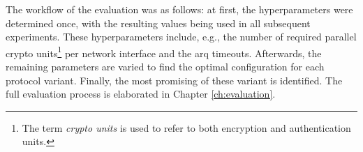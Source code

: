 The workflow of the evaluation was as follows: at first, the hyperparameters were determined once, with the resulting values being used in all
subsequent experiments. These hyperparameters include, e.g., the number of required parallel crypto units\footnote{The term \textit{crypto units} is
used to refer to both encryption and authentication units.} per network interface and the \gls{arq} timeouts. Afterwards, the remaining parameters are
varied to find the optimal configuration for each protocol variant. Finally, the most promising of these variant is identified. The full evaluation
process is elaborated in Chapter \ref{ch:evaluation}.
